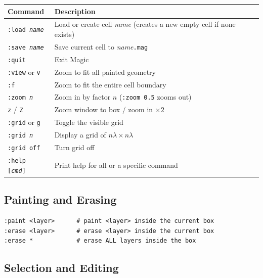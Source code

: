 \documentclass[11pt]{article}
\begin{document}
\begin{center}
\begin{tabular}{@{}lp{9.5cm}@{}}
\toprule
\textbf{Command} & \textbf{Description} \\
\midrule
\texttt{:load \textit{name}}    & Load or create cell \textit{name}
                                  (creates a new empty cell if none exists) \\
\texttt{:save \textit{name}}    & Save current cell to
                                  \textit{name}\texttt{.mag} \\
\texttt{:quit}                  & Exit Magic \\
\texttt{:view} or \texttt{v}    & Zoom to fit all painted geometry \\
\texttt{:f}                     & Zoom to fit the entire cell boundary \\
\texttt{:zoom \textit{n}}       & Zoom in by factor $n$
                                  (\texttt{:zoom 0.5} zooms out) \\
\texttt{z} / \texttt{Z}         & Zoom window to box / zoom in $\times 2$ \\
\texttt{:grid} or \texttt{g}    & Toggle the visible grid \\
\texttt{:grid \textit{n}}       & Display a grid of
                                  $n\lambda \times n\lambda$ \\
\texttt{:grid off}              & Turn grid off \\
\texttt{:help [\textit{cmd}]}   & Print help for all or a specific command \\
\bottomrule
\end{tabular}
\end{center}

\subsection{Painting and Erasing}

\begin{lstlisting}
:paint <layer>      # paint <layer> inside the current box
:erase <layer>      # erase <layer> inside the current box
:erase *            # erase ALL layers inside the box
\end{lstlisting}

\subsection{Selection and Editing}
\end{document}
